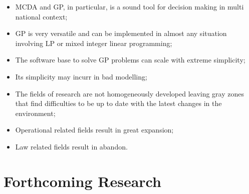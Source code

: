 \documentclass[a0,portrait]{a0poster}
\begin{document}
\begin{multicols}{2}
\begin{itemize}
\item MCDA and GP, in particular, is a sound tool for decision making in multi national context;
\item GP is very versatile and can be implemented in almost any situation involving LP or mixed integer linear programming;
\item The software base to solve GP problems can scale with extreme simplicity;
\item Its simplicity may incurr in bad modelling;
\item The fields of research are not homogeneously developed leaving gray zones that find difficulties to be up to date with the latest changes in the environment;
\item Operational related fields result in great expansion;
\item Law related fields result in abandon.
\end{itemize}

\color{DarkSlateGray} %


\section*{Forthcoming Research}




\end{multicols}
\end{document}
